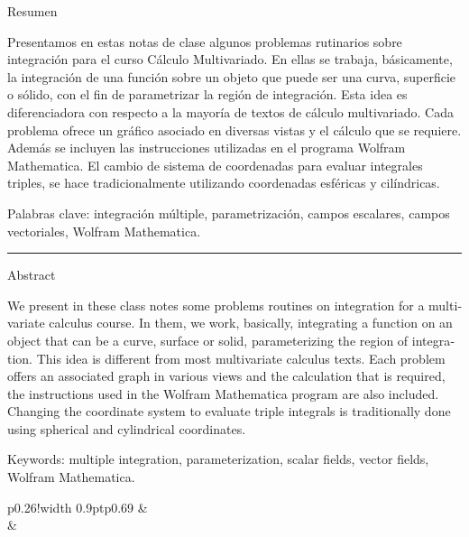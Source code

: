 {\medseries \large Resumen}
\thispagestyle{empty}
\vspace*{1mm}


Presentamos en estas notas de clase algunos problemas
rutinarios sobre integración para el curso Cálculo Multivariado. En ellas se trabaja, básicamente, la integración de una función sobre un objeto que puede ser una curva, superficie o sólido, con el fin de parametrizar la región de integración. Esta idea es diferenciadora con respecto a la mayoría de textos de cálculo multivariado. Cada problema ofrece un gráfico asociado en diversas vistas y el cálculo que se requiere. Además se incluyen las instrucciones utilizadas en el programa  {Wolfram Mathematica}. El cambio de sistema de coordenadas para evaluar integrales triples, se hace tradicionalmente utilizando coordenadas esféricas y cilíndricas.

\fontschap Palabras clave:  \normalfont integración múltiple, parametrización, campos escalares, campos vectoriales, Wolfram Mathematica.

\rule{1.8cm}{0.4pt}


\begin{otherlanguage}{english}
  {\medseries \large Abstract }
  \vspace*{1mm}


  We present in these class notes some problems
  routines on integration for a multivariate calculus course. In them, we work, basically, integrating a function on an object that can be a curve, surface or solid, parameterizing the region of integration.
  This idea is different from most multivariate calculus texts. Each problem offers an associated graph in various views and the calculation that is required, the instructions used in the {Wolfram Mathematica} program are also included. Changing the coordinate system to evaluate triple integrals is traditionally done using spherical and cylindrical coordinates.

  \fontschap Keywords:
  \normalfont multiple integration, parameterization, scalar fields, vector fields, Wolfram Mathematica.
\end{otherlanguage}

\vspace{1cm}
\begin{tabular}{p{}!{\vrule width 0.9pt}p{0.69\textwidth}}
  & \hspace{2mm}{\medseries \fontsize{11pt}{9pt}\selectfont{¿Como citar este libro?~/ How to cite this book?}} \\[3.5pt]
  & \hangindent=2mm 
  \fontsize{9pt}{10pt}
\end{tabular}\par
